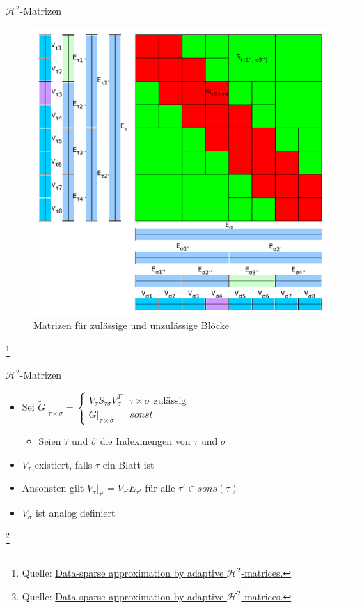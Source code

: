 \documentclass[10pt]{beamer}
\let\svthefootnote\thefootnote
\begin{document}
\begin{frame}{\(\mathcal{H}^2\)-Matrizen}
\begin{figure}
\begin{overprint}
      \centering\includegraphics[width=.5\linewidth]{figures/fg-h2-near-far-field-matrices.pdf}\caption{Matrizen für zulässige und unzulässige Blöcke}
    \end{overprint}
  \end{figure}

  \footnotesize
  \let\thefootnote\relax\footnote{Quelle: \href{https://link.springer.com/article/10.1007\%2Fs00607-002-1450-4?LI=true}{Data-sparse approximation by adaptive \(\mathcal{H}^2\)-matrices.}}
  \addtocounter{footnote}{-1}\let\thefootnote\svthefootnote\relax
  \normalsize
\end{frame}

\begin{frame}{\(\mathcal{H}^2\)-Matrizen}
  \begin{itemize}
    \item Sei \(\tilde{G}|_{\hat{\tau} \times \hat{\sigma}} =
    \begin{cases}
      V_{\tau} S_{\tau \sigma} V_{\sigma}^T & \tau \times \sigma \text{ zulässig} \\
      G|_{\hat{\tau} \times \hat{\sigma}}   & sonst
    \end{cases}\)
    \begin{itemize}
      \item Seien \(\hat{\tau}\) und \( \hat{\sigma}\) die Indexmengen von \(\tau\) und \(\sigma\)
    \end{itemize}
    \item \(V_{\tau}\) existiert, falls \(\tau\) ein Blatt ist
    \item Ansonsten gilt \(V_{\tau}|_{\hat{\tau} '} = V_{\tau '} E_{\tau '}\) für alle  \(\tau ' \in sons(\tau)\)
    \item \(V_{\sigma}\) ist analog definiert
  \end{itemize}

  \footnotesize
  \let\thefootnote\relax\footnote{Quelle: \href{https://link.springer.com/article/10.1007\%2Fs00607-002-1450-4?LI=true}{Data-sparse approximation by adaptive \(\mathcal{H}^2\)-matrices.}}
  \addtocounter{footnote}{-1}\let\thefootnote\svthefootnote\relax
  \normalsize
\end{frame}
\end{document}

